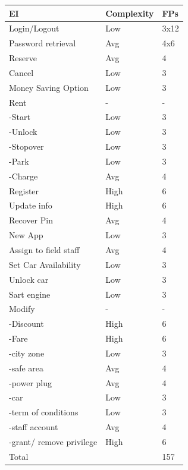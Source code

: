 \documentclass[english]{article}
\newenvironment{fpcounttable}[1]{
	\begin{center}
	\begin{longtable}{|l|l|l|}
	\hline 
	#1 & Complexity & FPs \\\hline
}{
	\end{longtable}\end{center}
}
\newcommand{\fptotal}[1]{
	\multicolumn{2}{|l|}{{Total}}
	& #1\\\hline
}
\newcommand{\eih}{ & High & 6}
\newcommand{\eia}{ &Avg & 4}
\newcommand{\eil}{ & Low & 3}
\begin{document}
\pagebreak
\begin{fpcounttable}{EI}
Login/Logout \eil x12 \\
Password retrieval \eia x6 \\
Reserve \eia \\
Cancel \eil \\
Money Saving Option \eil \\
Rent& - & - \\
-Start \eil\\
-Unlock \eil\\
-Stopover \eil\\
-Park \eil\\
-Charge \eia\\
Register \eih\\
Update info \eih\\
Recover Pin \eia\\
New App \eil\\
Assign to field staff \eia\\
Set Car Availability \eil\\
Unlock car\eil\\
Sart engine\eil\\
Modify &-&-\\
-Discount \eih\\
-Fare \eih\\
-city zone \eil\\
-safe area \eia\\
-power plug\eia\\
-car\eil\\
-term of conditions\eil \\
-staff account\eia\\
-grant/ remove privilege\eih\\\hline 

\fptotal{157}	
\end{fpcounttable}
\end{document}
